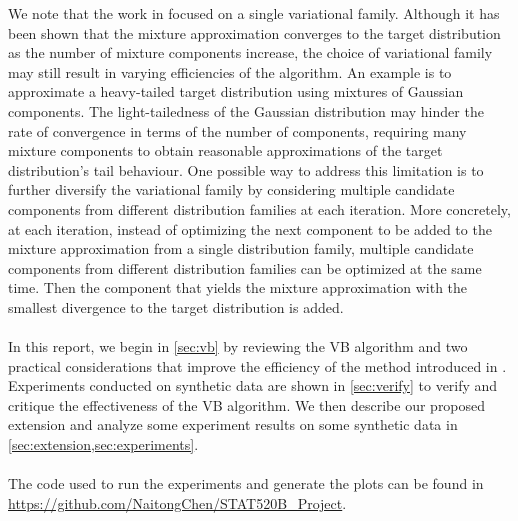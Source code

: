We note that the work in \cite{miller2017variational} focused on a single variational family. Although it has been shown that the mixture approximation converges to the target distribution as the number of mixture components increase, the choice of variational family may still result in varying efficiencies of the algorithm. An example is to approximate a heavy-tailed target distribution using mixtures of Gaussian components. The light-tailedness of the Gaussian distribution may hinder the rate of convergence in terms of the number of components, requiring many mixture components to obtain reasonable approximations of the target distribution's tail behaviour. One possible way to address this limitation is to further diversify the variational family by considering multiple candidate components from different distribution families at each iteration. More concretely, at each iteration, instead of optimizing the next component to be added to the mixture approximation from a single distribution family, multiple candidate components from different distribution families can be optimized at the same time. Then the component that yields the mixture approximation with the smallest divergence to the target distribution is added.\\\\
In this report, we begin in \cref{sec:vb} by reviewing the VB algorithm and two practical considerations that improve the efficiency of the method introduced in \cite{miller2017variational}. Experiments conducted on synthetic data are shown in \cref{sec:verify} to verify and critique the effectiveness of the VB algorithm. We then describe our proposed extension and analyze some experiment results on some synthetic data in \cref{sec:extension,sec:experiments}.\\\\
The code used to run the experiments and generate the plots can be found in \url{https://github.com/NaitongChen/STAT520B_Project}.

